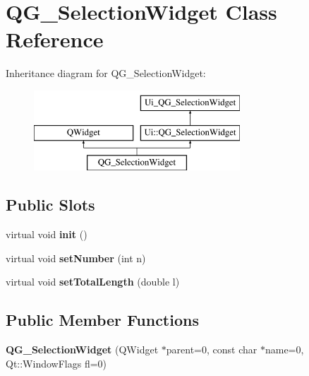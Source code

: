 \hypertarget{classQG__SelectionWidget}{\section{Q\-G\-\_\-\-Selection\-Widget Class Reference}
\label{classQG__SelectionWidget}
}
Inheritance diagram for Q\-G\-\_\-\-Selection\-Widget\-:\begin{figure}[H]
\begin{center}
\leavevmode
\includegraphics[height=3.000000cm]{classQG__SelectionWidget}
\end{center}
\end{figure}
\subsection*{Public Slots}
\begin{DoxyCompactItemize}
\item 
\hypertarget{classQG__SelectionWidget_a1e1d988165ad26539db08fc64ed19ea9}{virtual void {\bfseries init} ()}\label{classQG__SelectionWidget_a1e1d988165ad26539db08fc64ed19ea9}

\item 
\hypertarget{classQG__SelectionWidget_a19303b4149299a7bcad96ee85bae99b1}{virtual void {\bfseries set\-Number} (int n)}\label{classQG__SelectionWidget_a19303b4149299a7bcad96ee85bae99b1}

\item 
\hypertarget{classQG__SelectionWidget_a00312c90eb905ffbc3a09ac06bde124a}{virtual void {\bfseries set\-Total\-Length} (double l)}\label{classQG__SelectionWidget_a00312c90eb905ffbc3a09ac06bde124a}

\end{DoxyCompactItemize}
\subsection*{Public Member Functions}
\begin{DoxyCompactItemize}
\item 
\hypertarget{classQG__SelectionWidget_af90bdc2c8d8e796e1ddb5495bbaa0e09}{{\bfseries Q\-G\-\_\-\-Selection\-Widget} (Q\-Widget $\ast$parent=0, const char $\ast$name=0, Qt\-::\-Window\-Flags fl=0)}\label{classQG__SelectionWidget_af90bdc2c8d8e796e1ddb5495bbaa0e09}

\end{DoxyCompactItemize}
